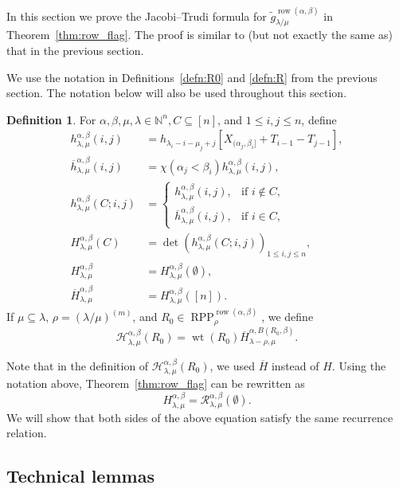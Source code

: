 \documentclass[12pt]{amsart}
\numberwithin{equation}{section}
\theoremstyle{definition}
\newtheorem{defn}[thm]{Definition}
\newcommand\wg{\widetilde{g}}
\newcommand\ovh{\overline{h}}
\newcommand\ovH{\overline{H}}
\newcommand\row{\operatorname{row}}
\newcommand\NN{\mathbb{N}}
\newcommand\RPP{\operatorname{RPP}}
\newcommand\lm{{\lambda/\mu}}
\newcommand\wt{\operatorname{wt}}
\newcommand\R{\mathcal{R}}
\newcommand\HH{\mathcal{H}}
\begin{document}
In this section we prove the Jacobi--Trudi formula for
$\wg_{\lambda/\mu}^{\row(\alpha,\beta)}$ in Theorem~\ref{thm:row_flag}. The
proof is similar to (but not exactly the same as) that in the previous section.

We use the notation in Definitions~\ref{defn:R0} and \ref{defn:R} from the
previous section. The notation below will also be used throughout this section.


\begin{defn}\label{defn:H}
For $\alpha,\beta,\mu,\lambda\in\NN^n,C\subseteq[n]$, and $1\le i,j\le n$,
define
\begin{align*}
  h_{\lambda,\mu}^{\alpha,\beta}(i,j) &=
  h_{\lambda_i-i-\mu_j+j}[X_{(\alpha_j,\beta_i]}+T_{i-1}-T_{j-1}],\\
  \ovh_{\lambda,\mu}^{\alpha,\beta}(i,j)
  &= \chi(\alpha_j<\beta_i) h_{\lambda,\mu}^{\alpha,\beta}(i,j),\\ 
  h_{\lambda,\mu}^{\alpha,\beta}(C;i,j)
  &= \begin{cases}
      h_{\lambda,\mu}^{\alpha,\beta}(i,j), & \mbox{if $i\not\in C$},\\
      \ovh_{\lambda,\mu}^{\alpha,\beta}(i,j), & \mbox{if $i\in C$},
    \end{cases}\\
  H_{\lambda,\mu}^{\alpha,\beta}(C)
  &= \det \left(h_{\lambda,\mu}^{\alpha,\beta}(C;i,j) \right)_{1\le i,j\le n},\\
  H_{\lambda,\mu}^{\alpha,\beta}
  &= H_{\lambda,\mu}^{\alpha,\beta}(\emptyset),\\
  \ovH_{\lambda,\mu}^{\alpha,\beta}
  &= H_{\lambda,\mu}^{\alpha,\beta}([n]).
\end{align*}
If $\mu\subseteq\lambda$, $\rho=(\lm)^{(m)}$, and
$R_0\in\RPP^{\row(\alpha,\beta)}_\rho$, we define
\begin{equation}
  \label{eq:defHH}
  \HH_{\lambda,\mu}^{\alpha,\beta}(R_0) = \wt(R_0) 
  \ovH_{\lambda-\rho,\mu}^{\alpha,B(R_0,\beta)}.
\end{equation}
\end{defn}

Note that in the definition of $\HH_{\lambda,\mu}^{\alpha,\beta}(R_0)$, we used
$\ovH$ instead of $H$. Using the notation above, Theorem~\ref{thm:row_flag} can
be rewritten as
\[
H_{\lambda,\mu}^{\alpha,\beta} = \R_{\lambda,\mu}^{\alpha,\beta}(\emptyset).
\]
We will show that both sides of the above equation satisfy the same
recurrence relation.



\subsection{Technical lemmas}
\label{sec:technical-lemmas-1}
\end{document}
